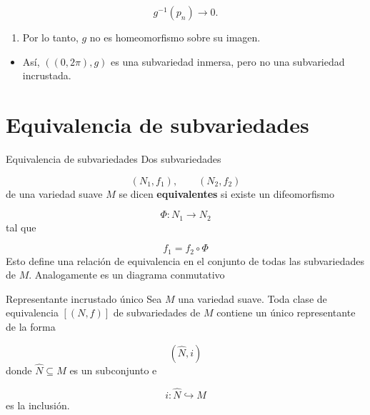 \begin{bookproof}{}
\[
g^{-1}(p_n)\to0.
\]
\begin{enumerate}[start=9]
\item Por lo tanto, $g$ no es homeomorfismo sobre su imagen.
\end{enumerate}
\begin{itemize}
\item Así, $((0,2\pi),g)$ es una subvariedad inmersa, pero no una subvariedad incrustada.
\end{itemize}
\bookqed
\end{bookproof}
\section{Equivalencia de subvariedades}
\begin{bookdefinition}{Equivalencia de subvariedades}
Dos subvariedades

\[
(N_1,f_1),\qquad (N_2,f_2)
\]
de una variedad suave $M$ se dicen \textbf{equivalentes} si existe un difeomorfismo

\[
\Phi:N_1\to N_2
\]
tal que

\[
f_1=f_2\circ\Phi
\]
Esto define una relación de equivalencia en el conjunto de todas las subvariedades de $M$. Analogamente 
 es un diagrama conmutativo

\end{bookdefinition}
\begin{bookproposition}{Representante incrustado único}
Sea $M$ una variedad suave. Toda clase de equivalencia $[(N,f)]$ de subvariedades de $M$ contiene un único representante de la forma

\[
(\widehat N,i)
\]
donde $\widehat N\subseteq M$ es un subconjunto e

\[
i:\widehat N\hookrightarrow M
\]
es la inclusión.

\end{bookproposition}
